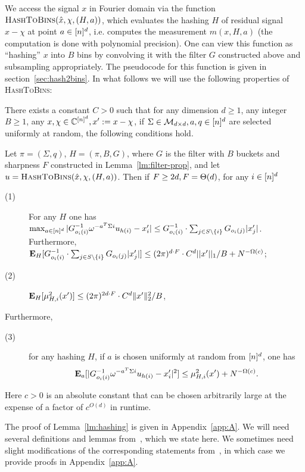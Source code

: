 We access the signal $x$ in Fourier domain via the function $\Call{HashToBins}{\hat x, \chi, (H, a)}$, which evaluates the hashing $H$ of residual signal $x-\chi$ at point $a\in \nsq$, i.e. computes the measurement $m(x, H, a)$ (the computation is done with polynomial precision). One can view this function as ``hashing''  $x$ into $B$ bins by convolving it with the filter $G$ constructed above and subsampling appropriately. The pseudocode for this function is given in section~\ref{sec:hash2bins}. In what follows we will use the following properties of \textsc{HashToBins}:
\begin{lemma}\label{lm:hashing}
There exists a constant $C>0$ such that for any dimension $d\geq 1$, any integer $B\geq 1$, any $x, \chi\in \C^\nsq, x':=x-\chi$, if  $\Sigma\in \gl, a, q\in \nsq$  are selected uniformly at random, the following conditions hold. 

Let $\pi=(\Sigma, q)$, $H=(\pi, B, G)$, where $G$ is the filter with $B$ buckets and sharpness $F$ constructed in Lemma~\ref{lm:filter-prop}, and let
$u =\Call{HashToBins}{\hat x, \chi, (H, a)}$.  Then if $\fc\geq 2d, F=\Theta(d)$,  for any $i\in \nsq$
  \begin{description}
\item[(1)] For any $H$ one has $\max_{a\in \nsq} \abs{G_{o_i(i)}^{-1}\omega^{-a^T\Sigma i}u_{h(i)} - x'_i}\leq G_{o_i(i)}^{-1}\cdot \sum_{j\in S\setminus \{i\}} G_{o_i(j)} |x'_j|$. Furthermore,
$\expect_H[G_{o_i(i)}^{-1}\cdot \sum_{j\in S\setminus \{i\}} G_{o_i(j)} |x'_j|]\leq \GS\cdot C^d ||x'||_1/B+N^{-\Omega(c)}$;
  \item[(2)] $\expect_H[\mu^2_{H, i}(x')] \leq  \GSS\cdot C^d \norm{2}{x'}^2/B$,
\end{description}
Furthermore, 
\begin{description}
\item[(3)] for any hashing $H$, if $a$ is chosen uniformly at random from $\nsq$, one has 
  $$
  \expect_{a}[\abs{G_{o_i(i)}^{-1}\omega^{-a^T\Sigma i}u_{h(i)} - x'_i}^2]\leq \mu^2_{H, i}(x')+N^{-\Omega(c)}.
  $$
\end{description}
Here $c>0$ is an absolute constant that can be chosen arbitrarily large at the expense of a  factor of $c^{O(d)}$ in runtime.
\end{lemma}
The proof of Lemma~\ref{lm:hashing} is given in Appendix~\ref{app:A}.  We will need several definitions and lemmas from~\cite{IK14a}, which we state here. We sometimes need slight modifications of the corresponding statements from~\cite{IK14a}, in which case we provide proofs in Appendix~\ref{app:A}.  
